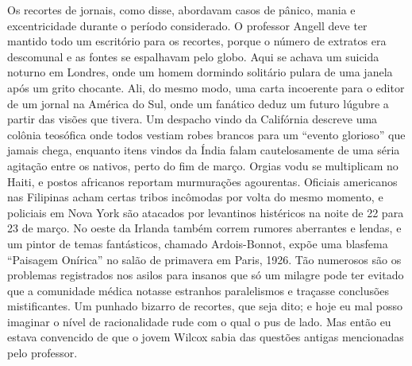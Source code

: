 \begin{pages}
\begin{Rightside}
Os recortes de jornais, como disse, abordavam casos de pânico, mania e
excentricidade durante o período considerado. O professor Angell deve
ter mantido todo um escritório para os recortes, porque o número de
extratos era descomunal e as fontes se espalhavam pelo globo. Aqui se
achava um suicida noturno em Londres, onde um homem dormindo solitário
pulara de uma janela após um grito chocante. Ali, do mesmo modo, uma
carta incoerente para o editor de um jornal na América do Sul, onde um
fanático deduz um futuro lúgubre a partir das visões que tivera. Um
despacho vindo da Califórnia descreve uma colônia teosófica onde todos
vestiam robes brancos para um ``evento glorioso'' que jamais chega,
enquanto itens vindos da Índia falam cautelosamente de uma séria
agitação entre os nativos, perto do fim de março. Orgias vodu se
multiplicam no Haiti, e postos africanos reportam murmurações
agourentas. Oficiais americanos nas Filipinas acham certas tribos
incômodas por volta do mesmo momento, e policiais em Nova York são
atacados por levantinos histéricos na noite de 22 para 23 de março. No
oeste da Irlanda também correm rumores aberrantes e lendas, e um pintor
de temas fantásticos, chamado Ardois-Bonnot, expõe uma blasfema
``Paisagem Onírica'' no salão de primavera em Paris, 1926. Tão numerosos
são os problemas registrados nos asilos para insanos que só um milagre
pode ter evitado que a comunidade médica notasse estranhos paralelismos
e traçasse conclusões mistificantes. Um punhado bizarro de recortes, que
seja dito; e hoje eu mal posso imaginar o nível de racionalidade rude
com o qual o pus de lado. Mas então eu estava convencido de que o jovem
Wilcox sabia das questões antigas mencionadas pelo professor.            

\pend
         \endnumbering
    \end{Rightside}
\end{pages}
\Pages

